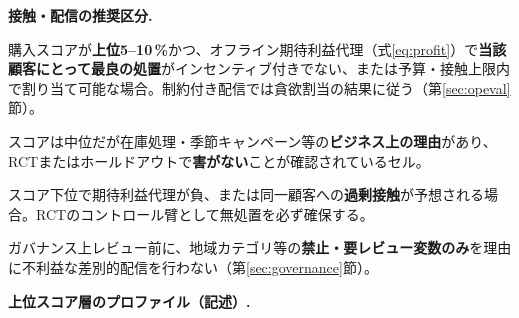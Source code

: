 \noindent\textbf{接触・配信の推奨区分.}\par\smallskip
\begingroup
\setlength{\leftmargini}{1.5em}%
\setlength{\labelsep}{0.6em}%
\begin{description}\setlength{\itemsep}{0.35em}\setlength{\parsep}{0pt}
  \item[\textbf{優先的接触（推奨）}] 購入スコアが\textbf{上位5--10\,\%}かつ、オフライン期待利益代理（式\eqref{eq:profit}）で\textbf{当該顧客にとって最良の処置}がインセンティブ付きでない、または予算・接触上限内で割り当て可能な場合。制約付き配信では貪欲割当の結果に従う（第\ref{sec:opeval}節）。
  \item[\textbf{条件付き接触}] スコアは中位だが在庫処理・季節キャンペーン等の\textbf{ビジネス上の理由}があり、RCTまたはホールドアウトで\textbf{害がない}ことが確認されているセル。
  \item[\textbf{接触回避・ホールドアウト}] スコア下位で期待利益代理が負、または同一顧客への\textbf{過剰接触}が予想される場合。RCTのコントロール臂として無処置を必ず確保する。
  \item[\textbf{禁止（ガバナンス）}] ガバナンス上レビュー前に、地域カテゴリ等の\textbf{禁止・要レビュー変数のみ}を理由に不利益な差別的配信を行わない（第\ref{sec:governance}節）。
\end{description}
\endgroup

\medskip\noindent\textbf{上位スコア層のプロファイル（記述）.}

